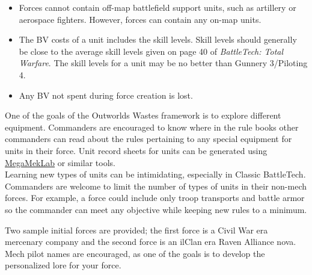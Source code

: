 \documentclass{article}
\begin{document}
\begin{itemize}
\item Forces cannot contain off-map battlefield support units, such as artillery or aerospace fighters.
However, forces can contain any on-map units.

\item The BV costs of a unit includes the skill levels.
Skill levels should generally be close to the average skill levels given on page 40 of \emph{BattleTech: Total Warfare}.
The skill levels for a unit may be no better than Gunnery 3/Piloting 4.

\item Any BV not spent during force creation is lost.

\end{itemize}

One of the goals of the Outworlds Wastes framework is to explore different equipment.
Commanders are encouraged to know where in the rule books other commanders can read about the rules pertaining to any special equipment for units in their force.
Unit record sheets for units can be generated using \href{https://megamek.org}{MegaMekLab} or similar tools.\\

Learning new types of units can be intimidating, especially in Classic BattleTech.
Commanders are welcome to limit the number of types of units in their non-mech forces.
For example, a force could include only troop transports and battle armor so the commander can meet any objective while keeping new rules to a minimum.

\newpage

Two sample initial forces are provided; the first force is a Civil War era mercenary company and the second force is an ilClan era Raven Alliance nova.
Mech pilot names are encouraged, as one of the goals is to develop the personalized lore for your force.
\end{document}

